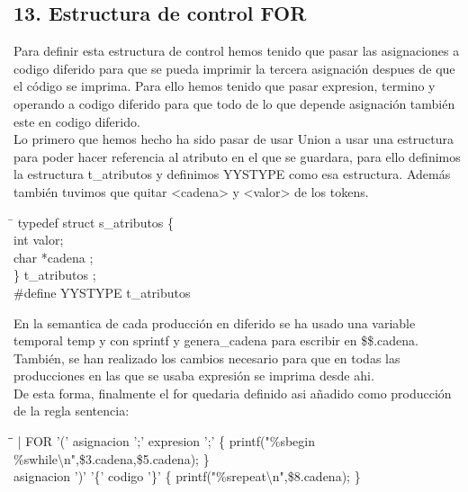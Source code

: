\documentclass[11pt,spanish]{article}
\begin{document}
		\subsection*{13. Estructura de control FOR }
		\label{subsec:13}
		Para definir esta estructura de control hemos tenido que pasar las asignaciones a codigo diferido para que se pueda imprimir la tercera asignación despues de que el código se imprima. Para ello hemos tenido que pasar expresion, termino y operando a codigo diferido para que todo de lo que depende asignación también este en codigo diferido.\\
		Lo primero que hemos hecho ha sido pasar de usar Union a usar una estructura para poder hacer referencia al atributo en el que se guardara, para ello definimos la estructura t\_atributos y definimos YYSTYPE como esa estructura. Además también tuvimos que quitar <cadena> y <valor> de los tokens.
		\begin{tcolorbox}
		\begin{tabbing}
			\hspace*{1cm}\=\kill
			typedef struct s\_atributos \{ \\
			\>	int valor;\\
			\>	char *cadena ;\\
			\} t\_atributos ; \\
			\#define YYSTYPE t\_atributos 
		\end{tabbing}
		\end{tcolorbox}
		En la semantica de cada producción en diferido se ha usado una variable temporal temp y con sprintf y genera\_cadena para escribir en \$\$.cadena. También, se han realizado los cambios necesario para que en todas las producciones en las que se usaba expresión se imprima desde ahi.\\
		De esta forma, finalmente el for quedaria definido asi añadido como producción de la regla sentencia:
		\begin{tcolorbox}
		\begin{tabbing}
			\hspace*{1cm}\= \hspace*{5.5cm}\=\kill	
			| FOR '(' asignacion ';' expresion ';'\>\>			\{ printf("\%sbegin \%swhile\textbackslash n",\$3.cadena,\$5.cadena); \}\\
			\>asignacion ')' '\{' codigo '\}'\>				\{ printf("\%srepeat\textbackslash n",\$8.cadena); \}
		\end{tabbing}
		\end{tcolorbox}
\end{document}
